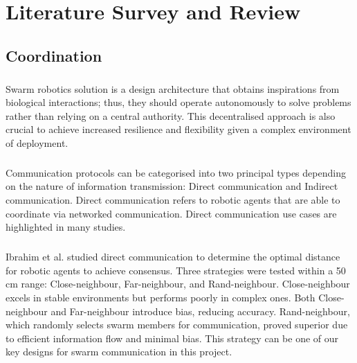 \chapter{Literature Survey and Review}

\section{Coordination}

\paragraph*{}
Swarm robotics solution is a design architecture that obtains inspirations from biological interactions; thus, they should operate autonomously to solve problems rather than relying on a central authority\cite{turkler2022usage}. This decentralised approach is also crucial to achieve increased resilience and flexibility given a complex environment of deployment\cite{das2024bio}.

\paragraph*{}
Communication protocols can be categorised into two principal types depending on the nature of information transmission: Direct communication and Indirect communication\cite{das2024bio}. Direct communication refers to robotic agents that are able to coordinate via networked communication. Direct communication use cases are highlighted in many studies.

\paragraph*{}
Ibrahim et al. \cite{ibrahim2024enhancing} studied direct communication to determine the optimal distance for robotic agents to achieve consensus. Three strategies were tested within a 50 cm range: Close-neighbour, Far-neighbour, and Rand-neighbour. Close-neighbour excels in stable environments but performs poorly in complex ones. Both Close-neighbour and Far-neighbour introduce bias, reducing accuracy. Rand-neighbour, which randomly selects swarm members for communication, proved superior due to efficient information flow and minimal bias. This strategy can be one of our key designs for swarm communication in this project.

